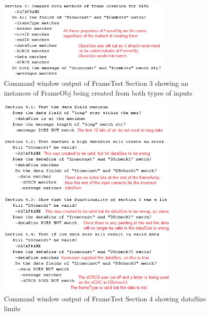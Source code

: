 \begin{figure}[h]
    \includegraphics[width=0.77\textwidth, left]{FrameTest3.PNG}
    \caption{Command window output of FrameTest Section 3 showing an instances of FrameObj being created from both types of inputs }
    \label{fig:FrameTest3}
\end{figure}



\begin{figure}[h]
    \includegraphics[width=0.8\textwidth, left]{FrameTest4.PNG}
    \caption{Command window output of FrameTest Section 4 showing dataSize limits  }
    \label{fig:FrameTest4}
\end{figure}



